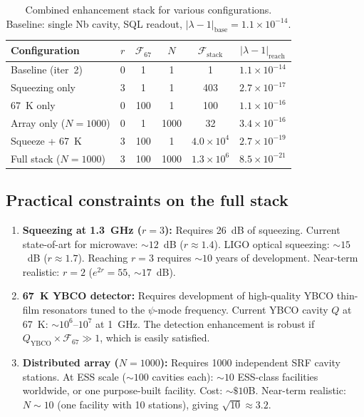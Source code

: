 \documentclass[11pt]{article}
\theoremstyle{definition}
\theoremstyle{remark}
\newcommand{\lam}{\lambda}
\begin{document}
\begin{table}[h]
\centering
\caption{Combined enhancement stack for various configurations.
Baseline: single Nb cavity, SQL readout, $|\lam-1|_{\mathrm{base}} = 1.1\times10^{-14}$.}
\label{tab:stack}
\begin{tabular}{@{}lccccc@{}}
\toprule
\textbf{Configuration} & $r$ & $\mathcal{F}_{67}$ & $N$ & $\mathcal{F}_{\mathrm{stack}}$ & $|\lam-1|_{\mathrm{reach}}$ \\
\midrule
Baseline (iter~2) & 0 & 1 & 1 & 1 & $1.1\times10^{-14}$ \\
Squeezing only & 3 & 1 & 1 & 403 & $2.7\times10^{-17}$ \\
67~K only & 0 & 100 & 1 & 100 & $1.1\times10^{-16}$ \\
Array only ($N=1000$) & 0 & 1 & 1000 & 32 & $3.4\times10^{-16}$ \\
Squeeze + 67~K & 3 & 100 & 1 & $4.0\times10^4$ & $2.7\times10^{-19}$ \\
Full stack ($N=1000$) & 3 & 100 & 1000 & $1.3\times10^6$ & $8.5\times10^{-21}$ \\
\bottomrule
\end{tabular}
\end{table}

\subsection{Practical constraints on the full stack}

\begin{enumerate}[nosep]
\item \textbf{Squeezing at 1.3~GHz ($r=3$):} Requires 26~dB of
squeezing. Current state-of-art for microwave: $\sim 12$~dB ($r\approx1.4$).
LIGO optical squeezing: $\sim 15$~dB ($r\approx1.7$). Reaching $r=3$
requires $\sim 10$ years of development. Near-term realistic: $r=2$
($e^{2r} = 55$, $\sim 17$~dB).

\item \textbf{67~K YBCO detector:} Requires development of high-quality
YBCO thin-film resonators tuned to the $\psi$-mode frequency. Current
YBCO cavity $Q$ at 67~K: $\sim 10^6$--$10^7$ at 1~GHz. The
detection enhancement is robust if $Q_{\mathrm{YBCO}}\times\mathcal{F}_{67}
\gg 1$, which is easily satisfied.

\item \textbf{Distributed array ($N=1000$):} Requires 1000 independent
SRF cavity stations. At ESS scale ($\sim 100$ cavities each):
$\sim 10$ ESS-class facilities worldwide, or one purpose-built facility.
Cost: $\sim \$10$B. Near-term realistic: $N \sim 10$ (one facility
with 10 stations), giving $\sqrt{10} \approx 3.2$.
\end{enumerate}
\end{document}
